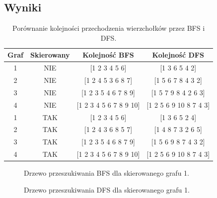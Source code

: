 \documentclass{article}
\begin{document}
\subsection{Wyniki}
\begin{table}[H]
\begin{adjustbox}{center}
\begin{tabular}{|c|c|c|c|}
    \hline
    Graf & Skierowany & Kolejność BFS & Kolejność DFS\\
    \hline
    1 & NIE & [1 2 3 4 5 6] & [1 3 6 5 4 2]\\
    \hline
    2 & NIE & [1 2 4 5 3 6 8 7] & [1 5 6 7 8 4 3 2]\\
    \hline
    3 & NIE & [1 2 3 5 4 6 7 8 9] & [1 5 7 9 8 4 2 6 3]\\
    \hline
    4 & NIE & [1 2 3 4 5 6 7 8 9 10] & [1 2 5 6 9 10 8 7 4 3]\\
    \hline
    1 & TAK & [1 2 3 4 5 6] & [1 3 6 5 2 4]\\
    \hline
    2 & TAK & [1 2 4 3 6 8 5 7] & [1 4 8 7 3 2 6 5]\\
    \hline
    3 & TAK & [1 2 3 5 4 6 8 7 9] & [1 5 6 9 8 7 4 3 2]\\
    \hline
    4 & TAK & [1 2 3 4 5 6 7 8 9 10] & [1 2 5 6 9 10 8 7 4 3]\\
    \hline
\end{tabular}
\end{adjustbox}
\caption{Porównanie kolejności przechodzenia wierzchołków przez BFS i DFS.}
\end{table}

\begin{figure}[H]
\centering
{}
\caption{Drzewo przeszukiwania BFS dla skierowanego grafu 1.}
\end{figure}

\begin{figure}[H]
\centering
{}
\caption{Drzewo przeszukiwania DFS dla skierowanego grafu 1.}
\end{figure}
\end{document}
